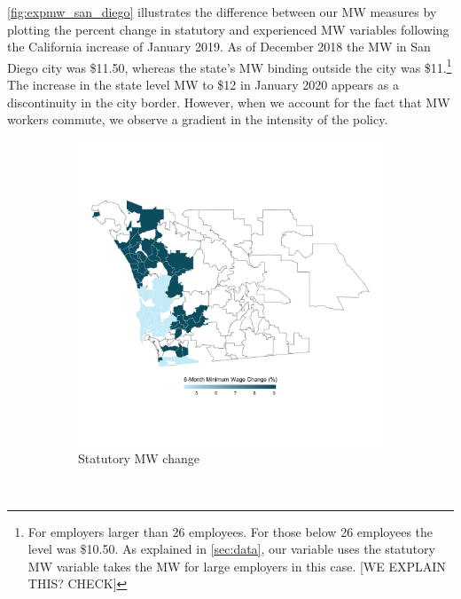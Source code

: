\autoref{fig:expmw_san_diego} illustrates the difference between our MW measures by plotting 
the percent change in statutory and experienced MW variables following the California 
increase of January 2019. As of December 2018 the MW in San Diego city was \$11.50, 
whereas the state's MW binding outside the city was \$11.\footnote{For employers larger 
	than 26 employees. For those below 26 employees the level was \$10.50. As explained in 
	\autoref{sec:data}, our variable uses the statutory MW variable takes the MW for
	large employers in this case. [WE EXPLAIN THIS? CHECK]}
The increase in the state level MW to \$12 in January 2020 appears as a discontinuity in the 
city border. However, when we account for the fact that MW workers commute, we observe a 
gradient in the intensity of the policy.

\begin{figure}
	\caption{The California MW increase of January 2019 in San Diego}
	\label{fig:expmw_san_diego}
	\centering
	\begin{subfigure}[b]{0.65\textwidth}
		\caption{Statutory MW change}
		\includegraphics[width = \textwidth]
		{../../analysis/descriptive_maps/output/San_Diego_mw_msa.png}
	\end{subfigure}\\
	\begin{subfigure}[b]{0.65\textwidth}

\end{subfigure}
\end{figure}
